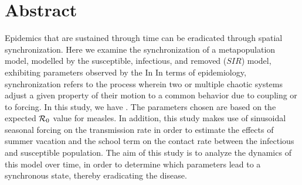 \documentclass[twocolumn,nofootinbib,showkeys,twoside,floatfix,unsortedaddress,flushbottom,10pt,aps,pra]{report}
\begin{document}
% 

\twocolumn

\section{Abstract} 
Epidemics that are sustained through time can be eradicated through spatial synchronization. Here we examine the synchronization of a metapopulation model, modelled by the susceptible, infectious, and removed ($SIR$) model, exhibiting parameters observed by the  
In In terms of epidemiology, synchronization refers to the process wherein two or multiple chaotic systems adjust a given property of their motion to a common behavior due to coupling or to forcing. In this study, we have . The parameters chosen are based on the expected ${\cal R}_0$ value for measles. In addition, this study makes use of sinusoidal seasonal forcing \cite{olsen1990chaos} on the transmission rate in order to estimate the effects of summer vacation and the school term on the contact rate between the infectious and susceptible population. The aim of this study is to analyze the dynamics of this model over time, in order to determine which parameters lead to a synchronous state, thereby eradicating the disease.
\par \smallskip \qquad
\end{document}
